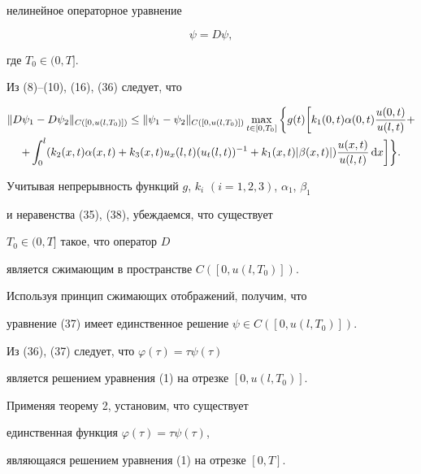 нелинейное операторное уравнение


\begin{equation}


\psi =D\psi,




\end{equation}


где $T_0\in (0,T]$.


Из (8)--(10), (16), (36) следует, что


\begin{multline}


\| D\psi_1-D\psi_2\|_{C([0,u(l,T_0)])} \leq


\| \psi_1-\psi_2\|_{C([0,u(l,T_0)])}


\max_{t\in [0,T_0]} \bigg\{ g(t)\bigg[ k_1(0,t)\alpha (0,t)


\frac{u(0,t)}{u(l,t)}+\\


+\int_0^l(k_2(x,t)\alpha (x,t)+k_3(x,t)u_x(l,t)


(u_t(l,t))^{-1} +k_1(x,t)| \beta (x,t)|


)\frac{u(x,t)}{u(l,t)}\d x\bigg]\bigg\}.




\end{multline}


Учитывая непрерывность функций $g$, $k_i$ $(i=1,2,3)$, $\alpha_1$, $\beta_1$


и неравенства (35), (38), убеждаемся, что существует


$T_0\in (0,T]$ такое, что оператор $D$


является сжимающим в пространстве $C([0,u(l,T_0)])$.


Используя принцип сжимающих отображений, получим, что


уравнение (37) имеет единственное решение $\psi \in C([0,u(l,T_0)])$.


Из (36), (37) следует, что $\varphi (\tau )=\tau \psi (\tau )$


является решением уравнения (1) на отрезке $[0,u(l,T_0)]$.


Применяя теорему 2, установим, что существует


единственная функция $\varphi (\tau )=\tau \psi (\tau )$,


являющаяся решением уравнения (1) на отрезке $[0,T]$.


\med





